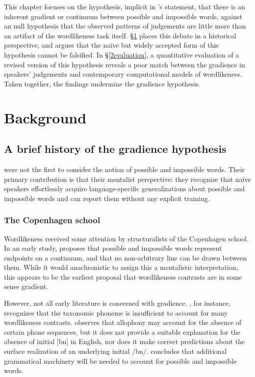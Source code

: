 This chapter focuses on the hypothesis, implicit in \citeauthor{Shademan2006}'s statement, that there is an inherent gradient or continuum between possible and impossible words, against an null hypothesis that the observed patterns of judgements are little more than an artifact of the wordlikeness task itself. \S\ref{2background} places this debate in a historical perspective, and argues that the naïve but widely accepted form of this hypothesis cannot be falsified. In \S\ref{2evaluation}, a quantitative evaluation of a revised version of this hypothesis reveals a poor match between the gradience in speakers' judgements and contemporary computational models of wordlikeness. Taken together, the findings undermine the gradience hypothesis.

\section{Background} \label{2background}

\subsection{A brief history of the gradience hypothesis} \label{history}

\citeauthor{Chomsky1965} were not the first to consider the notion of possible and impossible words. Their primary contribution is that their mentalist perspective: they recognize that naïve speakers effortlessly acquire language-specific generalizations about possible and impossible words and can report them without any explicit training.

\subsubsection{The Copenhagen school}

Wordlikeness received some attention by structuralists of the Copenhagen school. In an early study, \citet{Fischer-Jorgensen1952} proposes that possible and impossible words represent endpoints on a continuum, and that no non-arbitrary line can be drawn between them. While it would anachronistic to assign this a mentalistic interpretation, this appears to be the earliest proposal that wordlikeness contrasts are in some sense gradient. 

However, not all early literature is concerned with gradience. \citet[31]{Vogt1954}, for instance, recognizes that the taxonomic phoneme is insufficient to account for many wordlikeness contrasts. \citeauthor{Vogt1954} observes that allophony may account for the absence of certain phone sequences, but it does not provide a suitable explanation for the absence of initial [bn] in English, nor does it make correct predictions about the surface realization of an underlying initial /bn/. \citeauthor{Vogt1954} concludes that additional grammatical machinery will be needed to account for possible and impossible words. 

